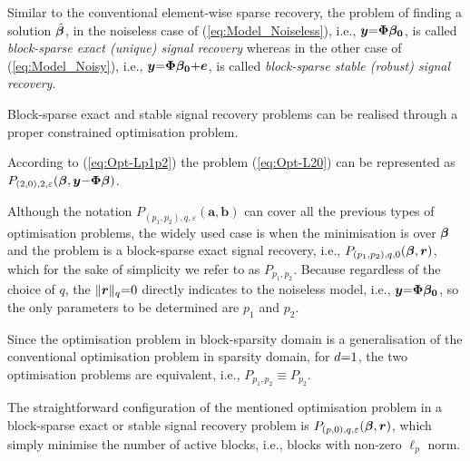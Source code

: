 Similar to the conventional element-wise sparse recovery, the problem of finding a solution $\hat{\boldsymbol{\beta}}$, in the noiseless case of (\ref{eq:Model_Noiseless}), i.e., $\boldsymbol{y} {=} \boldsymbol{\Phi} \boldsymbol{\beta_0}$, is called \emph{block-sparse exact (unique) signal recovery} whereas in the other case of (\ref{eq:Model_Noisy}), i.e., $\boldsymbol{y} {=} \boldsymbol{\Phi} \boldsymbol{\beta_0} {+} \boldsymbol{e}$, is called \emph{block-sparse stable (robust) signal recovery}.

Block-sparse exact and stable signal recovery problems can be realised through a proper constrained optimisation problem.

 


According to (\ref{eq:Opt-Lp1p2}) the problem (\ref{eq:Opt-L20}) can be represented as $P_{(2,0),2,\varepsilon} (\boldsymbol{\beta},\boldsymbol{y} {-} \boldsymbol{\Phi} \boldsymbol{\beta})$.

Although the notation $P_{(p_1,p_2),q,\varepsilon} (\boldsymbol{a},\boldsymbol{b})$ can cover all the previous types of optimisation problems, the widely used case is when the minimisation is over $\boldsymbol{\beta}$ and the problem is a block-sparse exact signal recovery, i.e., $P_{(p_1,p_2),q,0} (\boldsymbol{\beta},\boldsymbol{r})$, which for the sake of simplicity we refer to as $P_{p_1,p_2}$.
Because regardless of the choice of $q$, the $\Vert \boldsymbol{r} \Vert _q {=} 0$ directly indicates to the noiseless model, i.e., $\boldsymbol{y} {=} \boldsymbol{\Phi} \boldsymbol{\beta_0}$, so the only parameters to be determined are $p_1$ and $p_2$.

Since the optimisation problem in block-sparsity domain is a generalisation of the conventional optimisation problem in sparsity domain, for $d {=} 1$, the two optimisation problems are equivalent, i.e., $P_{p_1,p_2} {\equiv} P_{p_2}$.

The straightforward configuration of the mentioned optimisation problem in a block-sparse exact or stable signal recovery problem is $P_{(p,0),q,\varepsilon}(\boldsymbol{\beta},\boldsymbol{r})$, which simply minimise the number of active blocks, i.e., blocks with non-zero $\ell_p$ norm.

